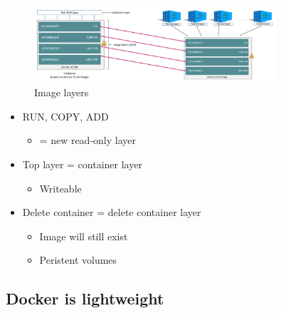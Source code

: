\documentclass{article}
\begin{document}
\begin{figure}[H]
    \centering
    \includegraphics[width=0.8\textwidth]{image-layers.png}
    \caption{Image layers}
\end{figure}

\begin{itemize}
    \item RUN, COPY, ADD
    \begin{itemize}
        \item = new read-only layer
    \end{itemize}
    \item Top layer = container layer
    \begin{itemize}
        \item Writeable
    \end{itemize}
    \item Delete container = delete container layer
    \begin{itemize}
        \item Image will still exist
        \item Peristent volumes
    \end{itemize}
\end{itemize}


\subsection{Docker is lightweight}
\end{document}
